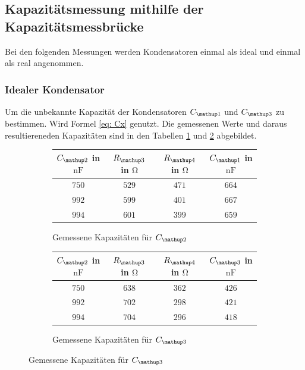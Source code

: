 \subsection{Kapazitätsmessung mithilfe der Kapazitätsmessbrücke}

Bei den folgenden Messungen werden 
Kondensatoren einmal als ideal und einmal als real angenommen.

\subsubsection{Idealer Kondensator}

Um die unbekannte Kapazität der Kondensatoren $C\ua{1}$ und $C\ua{3}$
zu bestimmen. Wird Formel \eqref{eq: Cx} genutzt.
Die gemessenen Werte und daraus resultiereneden Kapazitäten sind in den 
Tabellen \ref{tab:kap_c1} und \ref{tab:kap_c3} abgebildet.

\begin{figure}
\begin{subfigure}{0.49\textwidth}
\centering
\hspace{-0.25cm}
\caption{Gemessene Kapazitäten für $C\ua{2}$}
  \label{tab:kap_c1}
\begin{tabular}{S S S S}
    \toprule
    {$C\ua{2}$ in $\si{\nano\farad}$} &  {$R\ua{3}$ in $\si{\ohm}$} & {$R\ua{4}$ in $\si{\ohm}$} & {$C\ua{1}$ in $\si{\nano\farad}$}  \\
    \midrule
     {$\num{750}$} & {$\num{529}$} &  {$\num{471}$}& {$\num{664}$}  \\
     {$\num{992}$} & {$\num{599}$}  & {$\num{401}$} & {$\num{667}$}  \\
     {$\num{994}$} & {$\num{601}$}  & {$\num{399}$} & {$\num{659}$}  \\
     \bottomrule
	\end{tabular}
 
\end{subfigure}
\hspace{0.5cm}
\begin{subfigure}{0.49\textwidth}
\centering
\caption{Gemessene Kapazitäten für $C\ua{3}$}
  \label{tab:kap_c3}
\begin{tabular}{S S S S}
      \toprule
    {$C\ua{2}$ in $\si{\nano\farad}$} &  {$R\ua{3}$ in $\si{\ohm}$} & {$R\ua{4}$ in $\si{\ohm}$} & {$C\ua{3}$ in $\si{\nano\farad}$}  \\
    \midrule
     {$\num{750}$} & {$\num{638}$}  & {$\num{362}$} & {$\num{426}$}  \\
     {$\num{992}$} & {$\num{702}$}  & {$\num{298}$} & {$\num{421}$}  \\
     {$\num{994}$} & {$\num{704}$} &  {$\num{296}$}& {$\num{418}$}  \\
     \bottomrule
  \end{tabular}
\end{subfigure}
\label{fig:tabellen_cx_3}
\end{figure}

